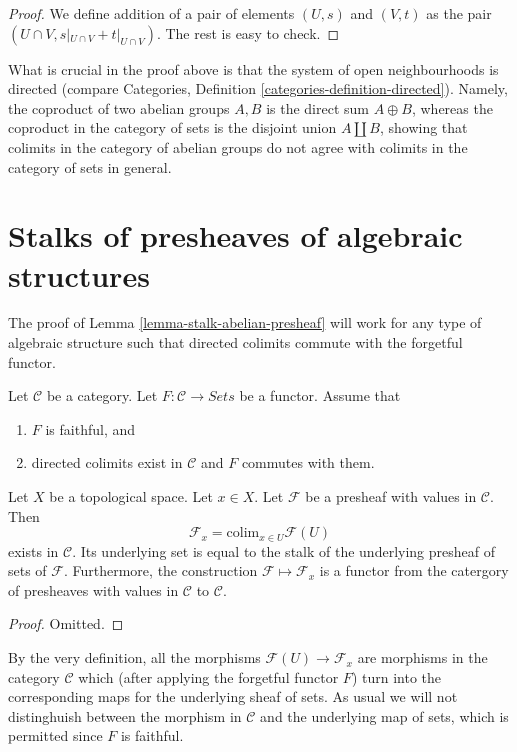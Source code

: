 \begin{proof}
We define addition of a pair of elements
$(U, s)$ and $(V, t)$ as the pair $(U \cap V, s|_{U\cap V} +
t|_{U \cap V})$. The rest is easy to check.
\end{proof}

\noindent
What is crucial in the proof above is that the system of open
neighbourhoods is directed (compare Categories, Definition
\ref{categories-definition-directed}). Namely, the coproduct
of two abelian groups $A, B$ is the direct sum $A \oplus B$, whereas
the coproduct in the category of sets is the disjoint
union $A \coprod B$, showing that colimits in the category
of abelian groups do not agree with colimits in the
category of sets in general.


\section{Stalks of presheaves of algebraic structures}
\label{stalks-presheaves-structures}

\noindent
The proof of Lemma \ref{lemma-stalk-abelian-presheaf} will work
for any type of algebraic structure such that directed
colimits commute with the forgetful functor.

\begin{lemma}
\label{lemma-stalk-presheaf-values-in-category}
Let $\mathcal{C}$ be a category. Let $F : \mathcal{C} \to \textit{Sets}$
be a functor. Assume that
\begin{enumerate}
\item $F$ is faithful, and
\item directed colimits exist in $\mathcal{C}$ and $F$ commutes with
them.
\end{enumerate}
Let $X$ be a topological space. Let $x \in X$. Let $\mathcal{F}$
be a presheaf with values in $\mathcal{C}$.
Then
$$
\mathcal{F}_x = \text{colim}_{x\in U} \mathcal{F}(U)
$$
exists in $\mathcal{C}$. Its underlying set is equal to the
stalk of the underlying presheaf of sets of $\mathcal{F}$.
Furthermore, the construction $\mathcal{F} \mapsto \mathcal{F}_x$
is a functor from the catergory of presheaves with values in
$\mathcal{C}$ to $\mathcal{C}$.
\end{lemma}

\begin{proof}
Omitted.
\end{proof}

\noindent
By the very definition, all the morphisms $\mathcal{F}(U)
\to \mathcal{F}_x$ are morphisms in the category $\mathcal{C}$
which (after applying the forgetful functor $F$) turn into
the corresponding maps for the underlying sheaf of sets.
As usual we will not distinghuish between the morphism
in $\mathcal{C}$ and the underlying map of sets, which
is permitted since $F$ is faithful.

